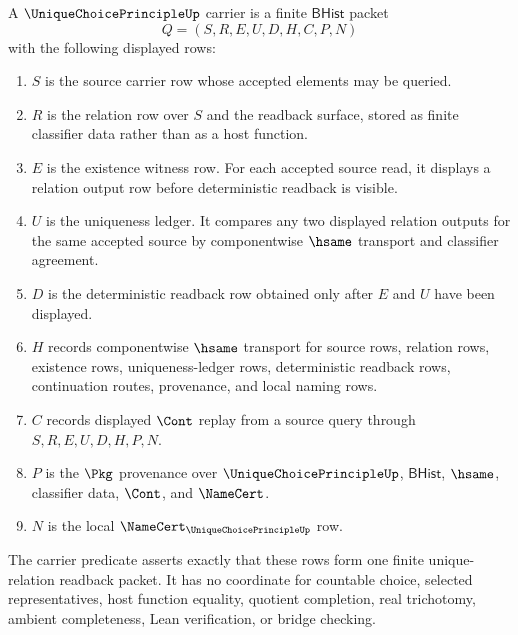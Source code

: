 \begin{definition}
\label{def:unique-choice-principle-carrier}
A $\UniqueChoicePrincipleUp$ carrier is a finite $\mathsf{BHist}$ packet
$$
Q=(S,R,E,U,D,H,C,P,N)
$$
with the following displayed rows:
\begin{enumerate}
\item $S$ is the source carrier row whose accepted elements may be queried.
\item $R$ is the relation row over $S$ and the readback surface, stored as finite classifier data rather than as a host function.
\item $E$ is the existence witness row. For each accepted source read, it displays a relation output row before deterministic readback is visible.
\item $U$ is the uniqueness ledger. It compares any two displayed relation outputs for the same accepted source by componentwise $\hsame$ transport and classifier agreement.
\item $D$ is the deterministic readback row obtained only after $E$ and $U$ have been displayed.
\item $H$ records componentwise $\hsame$ transport for source rows, relation rows, existence rows, uniqueness-ledger rows, deterministic readback rows, continuation routes, provenance, and local naming rows.
\item $C$ records displayed $\Cont$ replay from a source query through $S,R,E,U,D,H,P,N$.
\item $P$ is the $\Pkg$ provenance over $\UniqueChoicePrincipleUp$, $\mathsf{BHist}$, $\hsame$, classifier data, $\Cont$, and $\NameCert$.
\item $N$ is the local $\NameCert_{\UniqueChoicePrincipleUp}$ row.
\end{enumerate}
The carrier predicate asserts exactly that these rows form one finite unique-relation readback packet. It has no coordinate for countable choice, selected representatives, host function equality, quotient completion, real trichotomy, ambient completeness, Lean verification, or bridge checking.
\end{definition}

